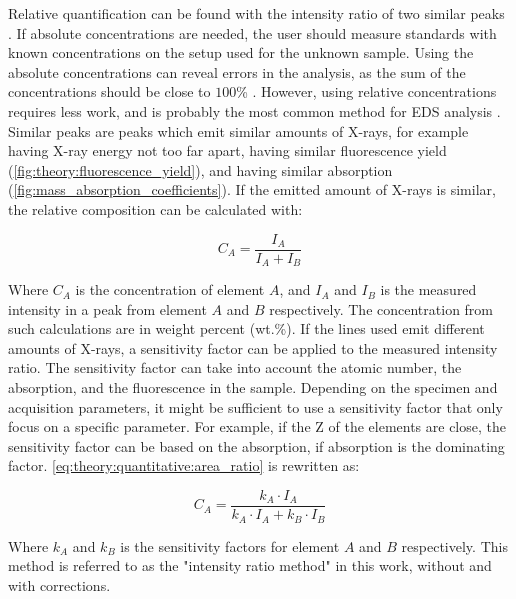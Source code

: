 Relative quantification can be found with the intensity ratio of two similar peaks \cite{goldstein_scanning_2018}.
If absolute concentrations are needed, the user should measure standards with known concentrations on the setup used for the unknown sample.
Using the absolute concentrations can reveal errors in the analysis, as the sum of the concentrations should be close to $100$\% \cite{goldstein_scanning_2018}.
However, using relative concentrations requires less work, and is probably the most common method for EDS analysis \cite{goldstein_scanning_2018}.
Similar peaks are peaks which emit similar amounts of X-rays, for example having X-ray energy not too far apart, having similar fluorescence yield (\cref{fig:theory:fluorescence_yield}), and having similar absorption (\cref{fig:mass_absorption_coefficients}).
If the emitted amount of X-rays is similar, the relative composition can be calculated with:

\begin{equation}
    \label{eq:theory:quantitative:area_ratio}
    C_A = \frac{I_A}{I_A + I_B}
\end{equation}

Where $C_A$ is the concentration of element $A$, and $I_A$ and $I_B$ is the measured intensity in a peak from element $A$ and $B$ respectively.
The concentration from such calculations are in weight percent (wt.\%).
If the lines used emit different amounts of X-rays, a sensitivity factor can be applied to the measured intensity ratio.
The sensitivity factor can take into account the atomic number, the absorption, and the fluorescence in the sample.
Depending on the specimen and acquisition parameters, it might be sufficient to use a sensitivity factor that only focus on a specific parameter.
For example, if the Z of the elements are close, the sensitivity factor can be based on the absorption, if absorption is the dominating factor.
\cref{eq:theory:quantitative:area_ratio} is rewritten as:

\begin{equation}
    \label{eq:theory:quantitative:area_ratio_corrected}
    C_A = \frac{k_A \cdot I_A}{k_A \cdot I_A + k_B \cdot I_B}
\end{equation}

Where $k_A$ and $k_B$ is the sensitivity factors for element $A$ and $B$ respectively.
This method is referred to as the "intensity ratio method" in this work, without and with corrections.





